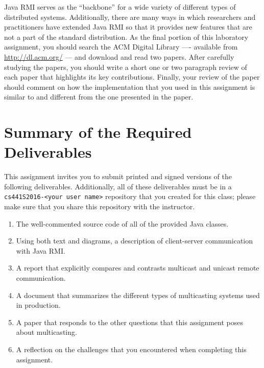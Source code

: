 Java RMI serves as the ``backbone'' for a wide variety of different types of distributed systems. Additionally, there
are many ways in which researchers and practitioners have extended Java RMI so that it provides new features that are
not a part of the standard distribution. As the final portion of this laboratory assignment, you should search the ACM
Digital Library ---- available from \url{http://dl.acm.org/} --- and download and read two papers. After carefully
studying the papers, you should write a short one or two paragraph review of each paper that highlights its key
contributions. Finally, your review of the paper should comment on how the implementation that you used in this
assignment is similar to and different from the one presented in the paper.

\section*{Summary of the Required Deliverables}

This assignment invites you to submit printed and signed versions of the following deliverables. Additionally,
all of these deliverables must be in a {\tt cs441S2016-<your user name>} repository that you created for this class;
please make sure that you share this repository with the instructor.

\vspace*{-.1in}

\begin{enumerate}
  \itemsep 0em

  \item The well-commented source code of all of the provided Java classes.

  \item Using both text and diagrams, a description of client-server communication with Java RMI.

  \item A report that explicitly compares and contrasts multicast and unicast remote communication.

  \item A document that summarizes the different types of multicasting systems used in production.

  \item A paper that responds to the other questions that this assignment poses about multicasting.

  \item A reflection on the challenges that you encountered when completing this assignment.

\end{enumerate}

